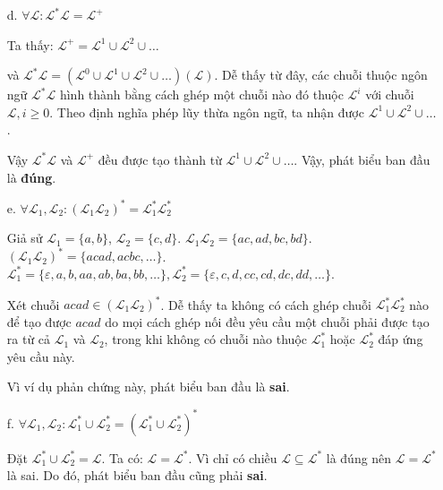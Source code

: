 \documentclass[12pt, a4paper]{article}
\begin{document}
\begin{itemize}
\begin{itemize}
			\item[d.]$\forall \mathcal{L}: \mathcal{L^*L} = \mathcal{L^+}$
			
			Ta thấy: $\mathcal{L^+} = \mathcal{L}^1 \cup \mathcal{L}^2 \cup \ldots$
			
			và $\mathcal{L^*L} = (\mathcal{L}^0 \cup \mathcal{L}^1 \cup \mathcal{L}^2 \cup \ldots)(\mathcal{L})$. Dễ thấy từ đây, các chuỗi thuộc ngôn ngữ $\mathcal{L^*L}$ hình thành bằng cách ghép một chuỗi nào đó thuộc $\mathcal{L}^i$ với chuỗi $\mathcal{L}, i \geq 0$. Theo định nghĩa phép lũy thừa ngôn ngữ, ta nhận được $\mathcal{L}^1 \cup \mathcal{L}^2 \cup \ldots$.
			
			Vậy $\mathcal{L^*L}$ và $\mathcal{L^+}$  đều được tạo thành từ $\mathcal{L}^1 \cup \mathcal{L}^2 \cup \ldots$. Vậy, phát biểu ban đầu là \textbf{đúng}.
			
			\item[e.] $\forall \mathcal{L}_1, \mathcal{L}_2: (\mathcal{L}_1\mathcal{L}_2)^* = \mathcal{L}_1^*\mathcal{L}_2^*$
			
			Giả sử $\mathcal{L}_1=\{a,b\}$, $\mathcal{L}_2=\{c,d\}$. $\mathcal{L}_1\mathcal{L}_2=\{ac, ad, bc, bd\}$. $(\mathcal{L}_1\mathcal{L}_2)^*=\{acad, acbc, \ldots\}$. $\mathcal{L}_1^*=\{\varepsilon, a, b, aa, ab, ba, bb, \ldots\}, \mathcal{L}_2^*=\{\varepsilon, c, d, cc, cd, dc, dd, \ldots\}$.
			
			Xét chuỗi $acad \in (\mathcal{L}_1\mathcal{L}_2)^*$. Dễ thấy ta không có cách ghép chuỗi $\mathcal{L}_1^*\mathcal{L}_2^*$ nào để tạo được $acad$ do mọi cách ghép nối đều yêu cầu một chuỗi phải được tạo ra từ cả $\mathcal{L}_1$ và $\mathcal{L}_2$, trong khi không có chuỗi nào thuộc $\mathcal{L}_1^*$ hoặc $\mathcal{L}_2^*$ đáp ứng yêu cầu này.
			
			Vì ví dụ phản chứng này, phát biểu ban đầu là \textbf{sai}.
			
			\item[f.] $\forall \mathcal{L}_1, \mathcal{L}_2: \mathcal{L}_1^* \cup \mathcal{L}_2^* = (\mathcal{L}_1^* \cup \mathcal{L}_2^*)^*$
			
			Đặt $\mathcal{L}_1^* \cup \mathcal{L}_2^* = \mathcal{L}$. Ta có: $\mathcal{L} = \mathcal{L^*}$. Vì chỉ có chiều $\mathcal{L} \subseteq \mathcal{L^*}$ là đúng nên $\mathcal{L} = \mathcal{L^*}$ là sai. Do đó, phát biểu ban đầu cũng phải \textbf{sai}.
		
		\end{itemize}
	
	\end{itemize}
	
\end{document}
